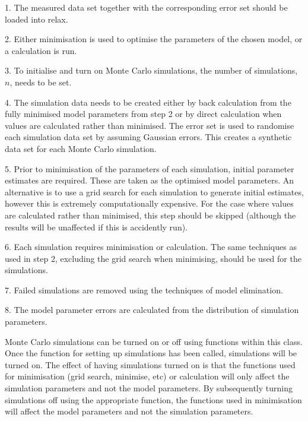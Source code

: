1.  The measured data set together with the corresponding error set should be loaded into
relax.

2.  Either minimisation  is used to optimise  the parameters of the chosen model, or a
calculation is run.

3.  To initialise and turn on Monte Carlo simulations, the number of simulations, $n$, needs
to be set.

4.  The simulation data needs to be created either by back calculation from the fully
minimised  model parameters from step 2 or by direct calculation when values are calculated
rather than minimised.   The error set is used to randomise each simulation data set by
assuming Gaussian errors.  This creates a synthetic data set for each Monte Carlo
simulation.

5.  Prior to minimisation  of the parameters of each simulation, initial parameter estimates
are required.  These are taken as the optimised  model parameters.  An alternative is to use
a grid search for each simulation to generate initial estimates, however this is extremely
computationally expensive.  For the case where values are calculated rather than minimised, 
this step should be skipped (although the results will be unaffected if this is accidently
run).

6.  Each simulation requires minimisation  or calculation.  The same techniques as used in
step 2, excluding the grid search when minimising, should be used for the simulations.

7.  Failed simulations are removed using the techniques of model elimination.  

8.  The model parameter errors are calculated from the distribution of simulation
parameters.


Monte Carlo simulations can be turned on or off using functions within this class.  Once the
function for setting up simulations has been called, simulations will be turned on.  The
effect of having simulations turned on is that the functions used for minimisation  (grid
search, minimise,  etc) or calculation will only affect the simulation parameters and not the
model parameters.  By subsequently turning simulations off using the appropriate function,
the functions used in minimisation  will affect the model parameters and not the simulation
parameters.


